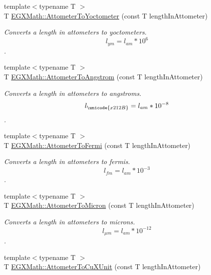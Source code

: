 \begin{DoxyCompactItemize}
{\footnotesize template$<$typename T $>$ }\\T \mbox{\hyperlink{group___e_g_x_math-_conversions-_length_conversions-_s_i-_attometer-_s_i_gaf325d426b8544c973b0f140b0d4e0f06}{E\+G\+X\+Math\+::\+Attometer\+To\+Yoctometer}} (const T length\+In\+Attometer)
\begin{DoxyCompactList}\small\item\em Converts a length in attometers to yoctometers. \[ l_{ym}=l_{am} * 10^{6} \]. \end{DoxyCompactList}\item 
{\footnotesize template$<$typename T $>$ }\\T \mbox{\hyperlink{group___e_g_x_math-_conversions-_length_conversions-_s_i-_attometer-_non-_s_i_ga331ff6e8159f6f00bb7a20e39fa4d756}{E\+G\+X\+Math\+::\+Attometer\+To\+Angstrom}} (const T length\+In\+Attometer)
\begin{DoxyCompactList}\small\item\em Converts a length in attometers to angstroms. \[ l_{\unicode{x212B}}=l_{am} * 10^{-8} \]. \end{DoxyCompactList}\item 
{\footnotesize template$<$typename T $>$ }\\T \mbox{\hyperlink{group___e_g_x_math-_conversions-_length_conversions-_s_i-_attometer-_non-_s_i_ga7dc342fa730e646b020d60aa6c2848ef}{E\+G\+X\+Math\+::\+Attometer\+To\+Fermi}} (const T length\+In\+Attometer)
\begin{DoxyCompactList}\small\item\em Converts a length in attometers to fermis. \[ l_{fm}=l_{am} * 10^{-3} \]. \end{DoxyCompactList}\item 
{\footnotesize template$<$typename T $>$ }\\T \mbox{\hyperlink{group___e_g_x_math-_conversions-_length_conversions-_s_i-_attometer-_non-_s_i_ga9aaf945221fbc8d469121e0fd0980b41}{E\+G\+X\+Math\+::\+Attometer\+To\+Micron}} (const T length\+In\+Attometer)
\begin{DoxyCompactList}\small\item\em Converts a length in attometers to microns. \[ l_{\mu m}=l_{am} * 10^{-12} \]. \end{DoxyCompactList}\item 
{\footnotesize template$<$typename T $>$ }\\T \mbox{\hyperlink{group___e_g_x_math-_conversions-_length_conversions-_s_i-_attometer-_non-_s_i_gabd388c2e0821ac9066b4fb87e35402b1}{E\+G\+X\+Math\+::\+Attometer\+To\+Cu\+X\+Unit}} (const T length\+In\+Attometer)

\end{DoxyCompactItemize}
